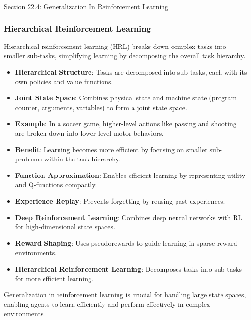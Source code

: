 \begin{notes}{Section 22.4: Generalization In Reinforcement Learning}
\begin{highlight}
    \end{highlight}
    
    \subsubsection*{Hierarchical Reinforcement Learning}
    
    Hierarchical reinforcement learning (HRL) breaks down complex tasks into smaller sub-tasks, simplifying learning by decomposing the overall task hierarchy.
    
    \begin{highlight}
    
        \begin{itemize}
            \item \textbf{Hierarchical Structure}: Tasks are decomposed into sub-tasks, each with its own policies and value functions.
            \item \textbf{Joint State Space}: Combines physical state and machine state (program counter, arguments, variables) to form a joint state space.
            \item \textbf{Example}: In a soccer game, higher-level actions like passing and shooting are broken down into lower-level motor behaviors.
            \item \textbf{Benefit}: Learning becomes more efficient by focusing on smaller sub-problems within the task hierarchy.
        \end{itemize}
    
    \end{highlight}
    
    \begin{highlight}
    
        \begin{itemize}
            \item \textbf{Function Approximation}: Enables efficient learning by representing utility and Q-functions compactly.
            \item \textbf{Experience Replay}: Prevents forgetting by reusing past experiences.
            \item \textbf{Deep Reinforcement Learning}: Combines deep neural networks with RL for high-dimensional state spaces.
            \item \textbf{Reward Shaping}: Uses pseudorewards to guide learning in sparse reward environments.
            \item \textbf{Hierarchical Reinforcement Learning}: Decomposes tasks into sub-tasks for more efficient learning.
        \end{itemize}
    
        Generalization in reinforcement learning is crucial for handling large state spaces, enabling agents to learn efficiently and perform effectively in complex environments.
    
    \end{highlight}
\end{notes}